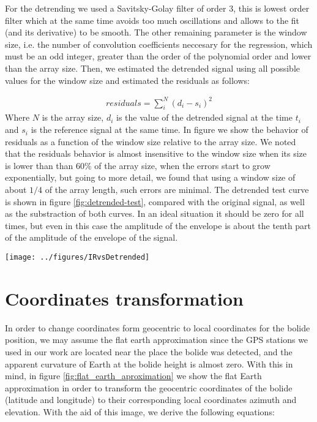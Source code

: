  For the detrending we used a Savitsky-Golay filter of order 3, this is lowest order filter which at the same time avoids too much oscillations and allows to the fit (and its derivative) to be smooth. The other remaining parameter is the window size, i.e. the number of convolution coefficients neccesary for the regression, which must be an odd integer, greater than the order of the polynomial order and lower than the array size. Then, we estimated the detrended signal using all possible values for the window size and estimated the residuals as follows:
 
 \begin{align}
     residuals = \sum_{i}^N \left(d_i - s_i\right)^2
 \end{align}
 Where $N$ is the array size, $d_i$ is the value of the detrended signal at the time $t_i$ and $s_i$ is the reference signal at the same time. In figure  we show the behavior of residuals as a function of the window size relative to the array size. We noted that the residuals behavior is almost insensitive to the window size when its size is lower than than 60\% of the array size, when the errors start to grow exponentially, but going to more detail, we found that using a window size of about $1/4$ of the array length, such errors are minimal. The detrended test curve is shown in figure \ref{fig:detrended-test}, compared with the original signal, as well as the substraction of both curves. In an ideal situation it should be zero for all times, but even in this case the amplitude of the envelope is about the tenth part of the amplitude of the envelope of the signal.

\begin{figure*}
\centering
\texttt{[image: ../figures/IRvsDetrended]}
\label{fig:detrended-test}
\caption{Left: Original test signal (blue continuous curve) compared with the result of detrending the superposition of the test signal with the test trend (figure \ref{fig:test-signal}b), which is the orange dashed curve. Right: Substraction of both curves of left side. The amplitude of the envelope of this residuals qualitatively is about tenth percent of the amplitude of the original signal.}
\end{figure*}

\section{Coordinates transformation}
\label{app:azimuth}

In order to change coordinates form geocentric to local coordinates for the bolide position, we may assume the flat earth approximation since the GPS stations we used in our work are located near the place the bolide was detected, and the apparent curvature of Earth at the bolide height is almost zero. With this in mind, in figure \ref{fig:flat_earth_aproximation} we show the flat Earth approximation in order to transform the geocentric coordinates of the bolide (latitude and longitude) to their corresponding local coordinates azimuth and elevation. With the aid of this image, we derive the following equations:

